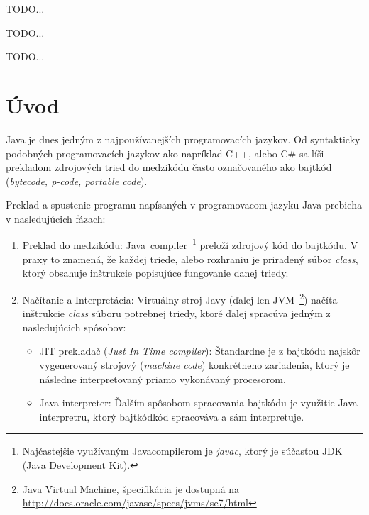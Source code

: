 \documentclass[11pt,final,oneside]{fithesis}
\begin{document}
\FrontMatter
\ThesisTitlePage

\begin{ThesisDeclaration}
\DeclarationText
\AdvisorName
\end{ThesisDeclaration}

\begin{ThesisAbstract}
TODO...
\end{ThesisAbstract}

\begin{ThesisKeyWords}
TODO...
\end{ThesisKeyWords}

\begin{ThesisThanks}
TODO...
\end{ThesisThanks}

\MainMatter
\tableofcontents
\chapter{Úvod}
Java je dnes jedným z najpoužívanejších programovacích jazykov.
Od syntakticky podobných programovacích jazykov ako napríklad C++, alebo C\# sa
líši prekladom zdrojových tried do medzikódu často označovaného ako
bajtkód (\textit{bytecode, p-code, portable code}).

Preklad a spustenie programu napísaných v programovacom jazyku Java prebieha v
nasledujúcich fázach:

\begin{enumerate}
\item Preklad do medzikódu: Java~compiler~\footnote{Najčastejšie využívaným
Javacompilerom je \textit{javac}, ktorý je súčasťou JDK (Java Development Kit).}
preloží zdrojový kód do bajtkódu. V praxy to znamená, že každej triede, alebo
rozhraniu je priradený súbor \textit{class}, ktorý obsahuje inštrukcie
popisujúce fungovanie danej triedy. \item Načítanie a Interpretácia: Virtuálny
stroj Javy (ďalej len JVM~\footnote{Java Virtual Machine, špecifikácia je
dostupná na \url{http://docs.oracle.com/javase/specs/jvms/se7/html}}) načíta
inštrukcie \textit{class} súboru potrebnej triedy, ktoré ďalej spracúva jedným
z nasledujúcich spôsobov:

\begin{itemize}
\item JIT prekladač (\textit{Just In Time compiler}): Štandardne je z
bajtkódu najskôr vygenerovaný strojový (\textit{machine code}) konkrétneho
zariadenia, ktorý je následne interpretovaný priamo vykonávaný
procesorom.
\item Java interpreter: Ďalším spôsobom spracovania bajtkódu je
využitie Java interpretru, ktorý bajtkódkód spracováva a sám interpretuje.
\end{itemize}
\end{enumerate}
\end{document}
